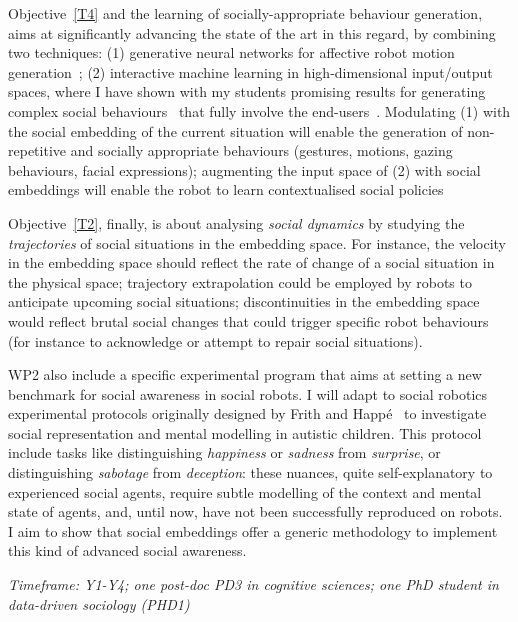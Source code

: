 

Objective~\ref{T4} and the learning of socially-appropriate behaviour
generation, \project aims at significantly advancing the state of the art in
this regard, by combining two techniques: (1) generative neural networks
for affective robot motion
generation~\cite{marmpena2019generating,suguitan2020moveae}; (2) interactive
machine learning in high-dimensional input/output spaces, where I have shown
with my students promising results for generating complex social
behaviours~\cite{senft2019teaching, winkle2020couch} that fully involve the
end-users~\cite{winkle2018social}. Modulating (1) with the social embedding of
the current situation will enable the generation of non-repetitive and socially
appropriate behaviours (gestures, motions, gazing behaviours, facial
expressions); augmenting the input space of (2) with social embeddings will
enable the robot to learn contextualised social policies

Objective~\ref{T2}, finally, is about analysing \emph{social dynamics} by
studying the \emph{trajectories} of social situations in the embedding space.
For instance, the velocity in the embedding space should reflect the rate of
change of a social situation in the physical space; trajectory extrapolation
could be employed by robots to anticipate upcoming social situations;
discontinuities in the embedding space would reflect brutal social changes that
could trigger specific robot behaviours (for instance to acknowledge or attempt
to repair social situations).


WP2 also include a specific experimental program that aims at setting a new
benchmark for social awareness in social robots. I will adapt to social
robotics~\cite{lemaignan2015mutual} experimental protocols originally designed
by Frith and Happé~\cite{frith1994autism} to investigate social representation
and mental modelling in autistic children.  This protocol include tasks like
distinguishing \emph{happiness} or \emph{sadness} from \emph{surprise}, or
distinguishing \emph{sabotage} from \emph{deception}: these nuances, quite
self-explanatory to experienced social agents, require subtle modelling of the
context and mental state of agents, and, until now, have not been successfully
reproduced on robots. I aim to show that social embeddings offer a generic
methodology to implement this kind of advanced social awareness.


\vspace{1em}
\noindent\emph{Timeframe: Y1-Y4; one post-doc PD3 in cognitive sciences; one PhD student in data-driven sociology (PHD1)}


